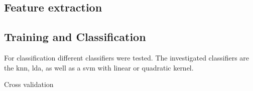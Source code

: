 \subsection{Feature extraction}


\subsection{Training and Classification}
\label{MachineLearnClassification}
For classification different classifiers were tested. The investigated classifiers are the \gls{knn}, \gls{lda}, as well as a \gls{svm} with linear or quadratic kernel.  




Cross validation




